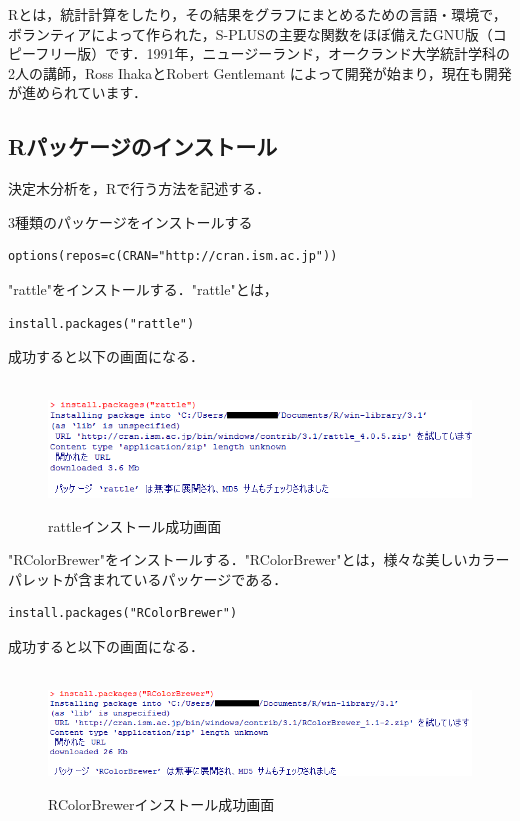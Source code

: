 Rとは，統計計算をしたり，その結果をグラフにまとめるための言語・環境で，ボランティアによって作られた，S-PLUSの主要な関数をほぼ備えたGNU版（コピーフリー版）です．1991年，ニュージーランド，オークランド大学統計学科の2人の講師，Ross IhakaとRobert Gentlemant によって開発が始まり，現在も開発が進められています\cite{takeuti2005}．


\subsection{Rパッケージのインストール}
決定木分析を，Rで行う方法を記述する．

3種類のパッケージをインストールする
{
\small
\begin{verbatim}
options(repos=c(CRAN="http://cran.ism.ac.jp"))
\end{verbatim}
}

"rattle"をインストールする．"rattle"とは，
{
\small
\begin{verbatim}
install.packages("rattle")
\end{verbatim}
}
成功すると以下の画面になる．
\begin{figure}[H]
\centering　
\includegraphics[width=13cm]{rattle.png}
\caption{rattleインストール成功画面}\label{rattle}
\end{figure}

"RColorBrewer"をインストールする．"RColorBrewer"とは，様々な美しいカラーパレットが含まれているパッケージである．
{
\small
\begin{verbatim}
install.packages("RColorBrewer")
\end{verbatim}
}
成功すると以下の画面になる．
\begin{figure}[H]
\centering　
\includegraphics[width=13cm]{RColorBrewer.png}
\caption{RColorBrewerインストール成功画面}\label{RColorBrewer}
\end{figure}

